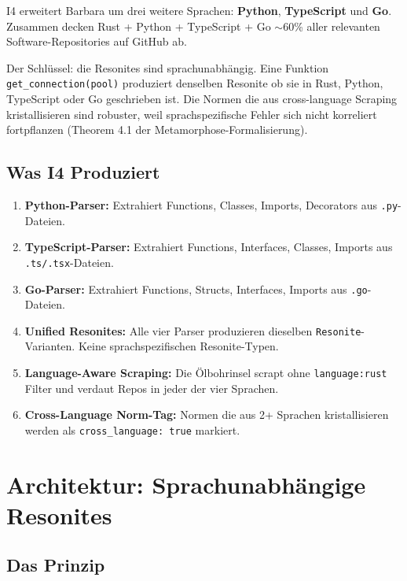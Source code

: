\documentclass[11pt,a4paper]{article}
\begin{document}
I4 erweitert Barbara um drei weitere Sprachen: \textbf{Python}, 
\textbf{TypeScript} und \textbf{Go}. Zusammen decken Rust + 
Python + TypeScript + Go $\sim$60\% aller relevanten 
Software-Repositories auf GitHub ab.

Der Schl\"ussel: die Resonites sind sprachunabh\"angig. 
Eine Funktion \texttt{get\_connection(pool)} produziert 
denselben Resonite ob sie in Rust, Python, TypeScript oder 
Go geschrieben ist. Die Normen die aus cross-language 
Scraping kristallisieren sind robuster, weil sprachspezifische 
Fehler sich nicht korreliert fortpflanzen (Theorem 4.1 der 
Metamorphose-Formalisierung).

\subsection{Was I4 Produziert}

\begin{enumerate}[nosep]
\item \textbf{Python-Parser:} Extrahiert Functions, Classes, 
      Imports, Decorators aus \texttt{.py}-Dateien.
\item \textbf{TypeScript-Parser:} Extrahiert Functions, 
      Interfaces, Classes, Imports aus \texttt{.ts/.tsx}-Dateien.
\item \textbf{Go-Parser:} Extrahiert Functions, Structs, 
      Interfaces, Imports aus \texttt{.go}-Dateien.
\item \textbf{Unified Resonites:} Alle vier Parser produzieren 
      dieselben \texttt{Resonite}-Varianten. Keine 
      sprachspezifischen Resonite-Typen.
\item \textbf{Language-Aware Scraping:} Die \"Olbohrinsel 
      scrapt ohne \texttt{language:rust} Filter und verdaut 
      Repos in jeder der vier Sprachen.
\item \textbf{Cross-Language Norm-Tag:} Normen die aus 
      2+ Sprachen kristallisieren werden als 
      \texttt{cross\_language: true} markiert.
\end{enumerate}


\section{Architektur: Sprachunabh\"angige Resonites}
\label{sec:arch}

\subsection{Das Prinzip}
\end{document}
